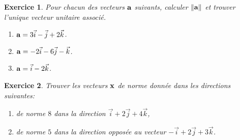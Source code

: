 \documentclass[12pt]{article}
\newtheorem{exercice}{\bf Exercice}
\newtheorem{correction}{\bf Correction exercice}
\newenvironment{exo}{
\begin{exercice}\smallskip\normalfont}{\end{exercice}
}
\newenvironment{cor}{
\begin{correction}\smallskip\normalfont}{\end{correction}
}
\newcommand{\I}{{ \vec{i}}}
\newcommand{\J}{{ \vec{j}}}
\newcommand{\K}{{ \vec{k}}}
\newif\ifcorrige\corrigefalse
\begin{document}
\ifcorrige
\color{magenta}
\begin{cor}
  $\qquad$ 
  En calculant coordonn\'ees par coordonn\'ees, on a
  $$p {\bf a}+q {\bf b}+r{\bf c}=(4,10,-8) \Leftrightarrow 
  \left \{ \begin{array}{ccc}
  p+q+2r&=&4\\
  3p-5q+r&=&10\\
  2p+6q-2r&=&-8   
  \end{array}    \right.$$
  En faisant $L_2 \leftarrow L_2-3L_1$ et $L_3\leftarrow L_3-2L_1$ on a alors 
  $$\left \{ \begin{array}{ccc}
  p+q+2r&=&4\\
  -8q-5r&=&-2\\
  4q-6r&=&-16   
  \end{array}    \right.$$
  En faisant $L_3\leftarrow 2L_3+L_2$ on a ensuite
  $$\left \{ \begin{array}{ccc}
  p+q+2r&=&4\\
  -8q-5r&=&-2\\
  -17r&=&-34   
  \end{array}    \right.$$
  En "remontant" dans le syst\`eme on trouve $p=1$, $q=-1$, $r=2$.

\end{cor}
\color{black}
\fi
\begin{exo} Pour chacun des vecteurs ${\bf a}$ suivants, calculer $\Vert {\bf a }\Vert$ et trouver l'unique vecteur unitaire associ\'e.
\begin{multicols}{3}
\begin{enumerate}
\item ${\bf a}=3\I-\J+2\K$.
\item ${\bf a}=-2\I-6\J-\K$.
\item ${\bf a}=\I-2\K$.
\end{enumerate}
\end{multicols}
\end{exo}

\ifcorrige
\color{magenta}
\begin{cor}
  $\qquad$ 
  Dans chaque cas, on calcule $\Vert {\bf a} \Vert$ puis $\vec{n}=\frac{{\bf a}}{\Vert {\bf a} \Vert}$. On trouve
  $$\vec{n}=\left(\frac{3}{\sqrt{14}}, \frac{-1}{\sqrt{14}},\frac{2}{\sqrt{14}}\right),\ \vec{n}=\left(\frac{-2}{\sqrt{41}}, \frac{-6}{\sqrt{41}},\frac{-1}{\sqrt{41}}\right),\ \vec{n}=\left(\frac{1}{\sqrt{5}}, 0,\frac{-2}{\sqrt{5}}\right).$$
\end{cor}
\color{black}
\fi

\begin{exo} Trouver les vecteurs $\bf x$ de norme donn\'ee dans les directions suivantes:
\begin{enumerate}
\item de norme $8$ dans la direction $\I+2\J+4\K$,
\item de norme $5$ dans la direction oppos\'ee au vecteur $-\I+2\J+3\K$.
\end{enumerate}
\end{exo}
\end{document}
